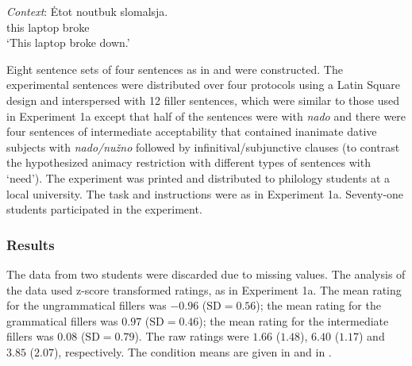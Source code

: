 \documentclass[output=paper,colorlinks,citecolor=brown]{langscibook}
\begin{document}
\ea \label{materials-exp1b-inan} \gll \textit{Context}: Ėtot noutbuk slomalsja.\\
{} this laptop broke\\
\glt \hspace{1.3cm} `This laptop broke down.' \\
\z\z

\noindent Eight sentence sets of four sentences as in  and  were constructed. The experimental sentences were distributed over four protocols using a Latin Square design and interspersed with 12 filler sentences, which were similar to those used in Experiment 1a except that half of the sentences were with \textit{nado} and there were four sentences of intermediate acceptability that contained inanimate dative subjects with \textit{nado/nužno} followed by infinitival/subjunctive clauses (to contrast the hypothesized animacy restriction with different types of sentences with `need'). The experiment was printed and distributed to philology students at a local university. The task and instructions were as in Experiment 1a. Seventy-one students participated in the experiment.

\subsubsection{Results}

The data from two students were discarded due to missing values. The analysis of the data used z-score transformed ratings, as in Experiment 1a. The mean rating for the ungrammatical fillers was $-0.96$ ($\text{SD} =0.56$); the mean rating for the grammatical fillers was $0.97$ ($\text{SD} =0.46$); the mean rating for the intermediate fillers was $0.08$ ($\text{SD} =0.79$). The raw ratings were $1.66$ ($1.48$),  $6.40$ ($1.17$) and $3.85$ ($2.07$), respectively. The condition means are given in  and in .
\end{document}
